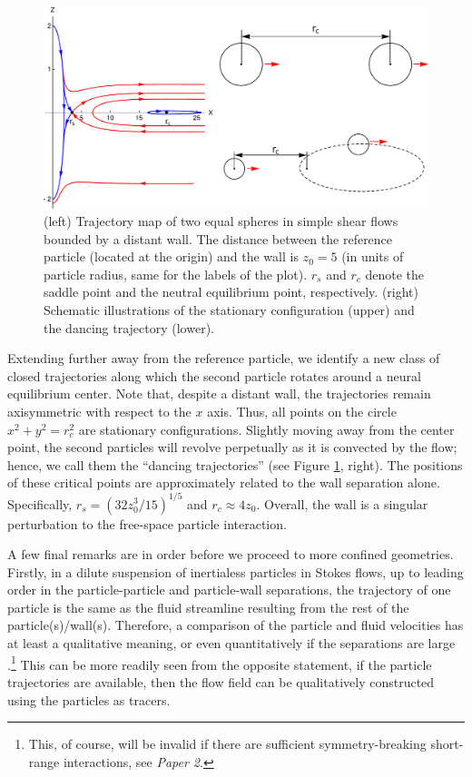 \begin{figure}%
  \centering
  \includegraphics[width=\columnwidth]{itzhak-boris.pdf}
  \caption{
  (left) Trajectory map of two equal spheres in simple shear flows bounded by a distant wall. The distance between the reference particle (located at the origin) and the wall is $z_0=5$ (in units of particle radius, same for the labels of the plot). $r_s$ and $r_c$ denote the saddle point and the neutral equilibrium point, respectively.
  (right) Schematic illustrations of the stationary configuration (upper) and the dancing trajectory (lower).}
  \label{fig:itzhak-boris}
\end{figure}

Extending further away from the reference particle, we identify a new class of closed trajectories along which the second particle rotates around a neural equilibrium center. Note that, despite a distant wall, the trajectories remain axisymmetric with respect to the $x$ axis. Thus, all points on the circle $x^2+y^2=r_c^2$ are stationary configurations.
Slightly moving away from the center point, the second particles will revolve perpetually as it is convected by the flow; hence, we call them the ``dancing trajectories'' (see Figure \ref{fig:itzhak-boris}, right).
The positions of these critical points are approximately related to the wall separation alone. Specifically, $r_s=(32z_0^3/15)^{1/5}$ and $r_c \approx 4z_0$.
Overall, the wall is a singular perturbation to the free-space particle interaction.

\medskip
A few final remarks are in order before we proceed to more confined geometries.
Firstly, in a dilute suspension of inertialess particles in Stokes flows, up to leading order in the particle-particle and particle-wall separations, the trajectory of one particle is the same as the fluid streamline resulting from the rest of the particle(s)/wall(s). Therefore, a comparison of the particle and fluid velocities has at least a qualitative meaning, or even quantitatively if the separations are large \citep{zurita-gotor_2007}.\footnote{This, of course, will be invalid if there are sufficient symmetry-breaking short-range interactions, see \eg \emph{Paper 2}.}
This can be more readily seen from the opposite statement, \ie if the particle trajectories are available, then the flow field can be qualitatively constructed using the particles as tracers.

